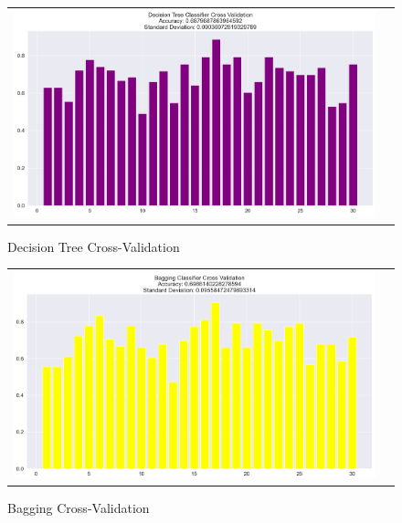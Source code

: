 \documentclass[conference]{IEEEtran}
\begin{document}
\begin{figure}[!h]
	\centering
	\begin{center}
		\begin{tabular}{cc}
			\includegraphics[scale=0.18]{pictures/pic_21.png}&
		\end{tabular}
	\end{center}
	\caption{Decision Tree Cross-Validation}
	\label{fig:21}
\end{figure}

\begin{figure}[!h]
	\centering
	\begin{center}
		\begin{tabular}{cc}
			\includegraphics[scale=0.18]{pictures/pic_22.png}&
		\end{tabular}
	\end{center}
	\caption{Bagging Cross-Validation}
	\label{fig:22}
\end{figure}
\end{document}
